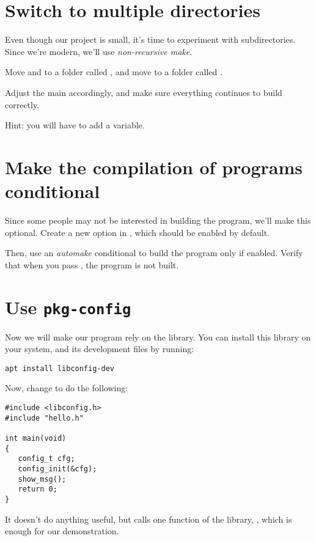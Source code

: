 \section{Switch to multiple directories}

Even though our project is small, it's time to experiment with
subdirectories. Since we're modern, we'll use {\em non-recursive
  make}.

Move  and  to a folder called ,
and move  to a folder called .

Adjust the main  accordingly, and make sure
everything continues to build correctly.

Hint: you will have to add a  variable.

\section{Make the compilation of programs conditional}

Since some people may not be interested in building the 
program, we'll make this optional. Create a new
 option in , which should
be enabled by default.

Then, use an {\em automake} conditional to build the 
program only if enabled. Verify that when you pass
, the  program is not built.

\section{Use {\tt pkg-config}}

Now we will make our program rely on the  library. You
can install this library on your system, and its development files by
running:

\begin{verbatim}
apt install libconfig-dev
\end{verbatim}

Now, change  to do the following:

\begin{verbatim}
#include <libconfig.h>
#include "hello.h"

int main(void)
{
   config_t cfg;
   config_init(&cfg);
   show_msg();
   return 0;
}
\end{verbatim}

It doesn't do anything useful, but calls one function of the
 library, , which is enough for our
demonstration.

